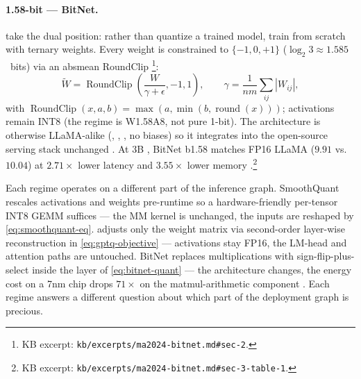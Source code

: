 \paragraph{1.58-bit --- BitNet.}
\citet{ma2024-bitnet} take the dual position: rather than quantize a
trained model, train from scratch with ternary weights. Every weight
is constrained to $\{-1, 0, +1\}$ ($\log_2 3 \approx 1.585$~bits) via
an absmean RoundClip \citep[\S 2, Eq.~1--3]{ma2024-bitnet}\footnote{KB
excerpt: \nolinkurl{kb/excerpts/ma2024-bitnet.md#sec-2}.}:
\begin{equation}
\widetilde{W} = \operatorname{RoundClip}\!\left(\frac{W}{\gamma + \epsilon}, -1, 1\right),
\qquad
\gamma = \frac{1}{nm} \sum_{ij} |W_{ij}|,
\label{eq:bitnet-quant}
\end{equation}
with $\operatorname{RoundClip}(x, a, b) = \max(a, \min(b, \operatorname{round}(x)))$;
activations remain INT8 (the regime is W1.58A8, not pure 1-bit). The
architecture is otherwise LLaMA-alike (, , , no
biases) so it integrates into the open-source serving stack
unchanged \citep[\S 2]{ma2024-bitnet}. At 3B ,
BitNet b1.58 matches FP16 LLaMA  ($9.91$ vs.\ $10.04$) at
$2.71\times$ lower latency and $3.55\times$ lower memory
\citep[\S 3, Table~1]{ma2024-bitnet}.\footnote{KB excerpt:
\nolinkurl{kb/excerpts/ma2024-bitnet.md#sec-3-table-1}.}

\begin{intuition}
Each regime operates on a different part of the inference graph.
SmoothQuant rescales activations and weights pre-runtime so a
hardware-friendly per-tensor INT8 GEMM suffices --- the MM kernel is
unchanged, the inputs are reshaped by \cref{eq:smoothquant-eq}. 
adjusts only the weight matrix via second-order layer-wise
reconstruction in \cref{eq:gptq-objective} --- activations stay FP16,
the LM-head and attention paths are untouched. BitNet replaces
multiplications with sign-flip-plus-select inside the  layer
of \cref{eq:bitnet-quant} --- the architecture changes, the energy
cost on a 7nm chip drops $71\times$ on the matmul-arithmetic
component \citep[\S 3]{ma2024-bitnet}. Each regime answers a different
question about which part of the deployment graph is precious.
\end{intuition}

